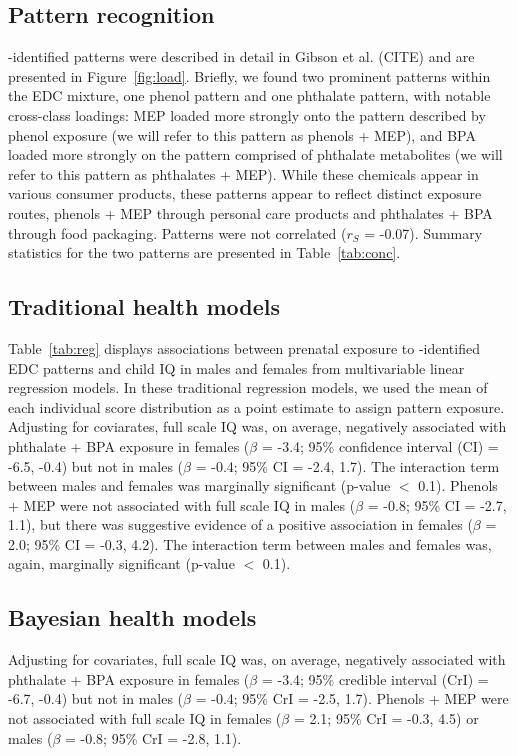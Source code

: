 \endgroup

\subsection{Pattern recognition}
\bnmfc-identified patterns were described in detail in Gibson et al. (CITE) and are presented in Figure~\ref{fig:load}. Briefly, we found two prominent patterns within the EDC mixture, one phenol pattern and one phthalate pattern, with notable cross-class loadings: MEP loaded more strongly onto the pattern described by phenol exposure (we will refer to this pattern as phenols + MEP), and BPA loaded more strongly on the pattern comprised of phthalate metabolites (we will refer to this pattern as phthalates + MEP). While these chemicals appear in various consumer products, these patterns appear to reflect distinct exposure routes, phenols + MEP through personal care products and phthalates + BPA through food packaging. Patterns were not correlated ($r_S$ = -0.07). Summary statistics for the two patterns are presented in Table~\ref{tab:conc}.

\subsection{Traditional health models}
Table~\ref{tab:reg} displays associations between prenatal exposure to \bnmfc-identified EDC patterns and child IQ in males and females from multivariable linear regression models. In these traditional regression models, we used the mean of each individual score distribution as a point estimate to assign pattern exposure. Adjusting for coviarates, full scale IQ was, on average, negatively associated with phthalate + BPA exposure in females ($\beta$ = -3.4; 95\% confidence interval (CI) = -6.5, -0.4) but not in males ($\beta$ = -0.4; 95\% CI = -2.4, 1.7). The interaction term between males and females was marginally significant (p-value $<$ 0.1). Phenols + MEP were not associated with full scale IQ in males ($\beta$ = -0.8; 95\% CI =  -2.7, 1.1), but there was suggestive evidence of a positive association in females ($\beta$ = 2.0; 95\% CI = -0.3, 4.2). The interaction term between males and females was, again, marginally significant (p-value $<$ 0.1).

\subsection{Bayesian health models}
Adjusting for covariates, full scale IQ was, on average, negatively associated with phthalate + BPA exposure in females ($\beta$ = -3.4; 95\% credible interval (CrI) = -6.7, -0.4) but not in males ($\beta$ = -0.4; 95\% CrI = -2.5, 1.7). Phenols + MEP were not associated with full scale IQ in females ($\beta$ = 2.1; 95\% CrI = -0.3, 4.5) or males ($\beta$ = -0.8; 95\% CrI = -2.8, 1.1). \\

